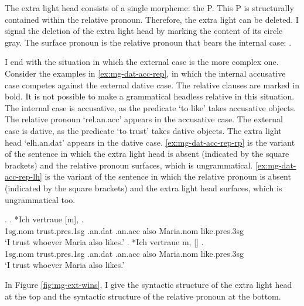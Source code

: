 The extra light head consists of a single morpheme: the P.
This P is structurally contained within the relative pronoun. Therefore, the extra light can be deleted. I signal the deletion of the extra light head by marking the content of its circle gray.
The surface pronoun is the relative pronoun that bears the internal case: .

I end with the situation in which the external case is the more complex one.
Consider the examples in \ref{ex:mg-dat-acc-rep}, in which the internal accusative case competes against the external dative case. The relative clauses are marked in bold. It is not possible to make a grammatical headless relative in this situation.
The internal case is accusative, as the predicate  `to like' takes accusative objects. The relative pronoun  `\ac{rel}.\ac{an}.\ac{acc}' appears in the accusative case.
The external case is dative, as the predicate  `to trust' takes dative objects. The extra light head  `\ac{elh}.\ac{an}.\ac{dat}' appears in the dative case.
\ref{ex:mg-dat-acc-rep-rp} is the variant of the sentence in which the extra light head is absent (indicated by the square brackets) and the relative pronoun surfaces, which is ungrammatical.
\ref{ex:mg-dat-acc-rep-lh} is the variant of the sentence in which the relative pronoun is absent (indicated by the square brackets) and the extra light head surfaces, which is ungrammatical too.

\ex.\label{ex:mg-dat-acc-rep}
\ag. *Ich vertraue [m],    .\\
1\ac{sg}.\ac{nom} trust.\ac{pres}.1\ac{sg}\scsub{[dat]} .\ac{an}.\ac{dat} .\ac{an}.\ac{acc} also Maria.\ac{nom} like.\ac{pres}.3\ac{sg}\scsub{[acc]}\\
`I trust whoever Maria also likes.' \label{ex:mg-dat-acc-rep-rp}
\bg. *Ich vertraue m, []   .\\
1\ac{sg}.\ac{nom} trust.\ac{pres}.1\ac{sg}\scsub{[dat]} .\ac{an}.\ac{dat} .\ac{an}.\ac{acc} also Maria.\ac{nom} like.\ac{pres}.3\ac{sg}\scsub{[acc]}\\
`I trust whoever Maria also likes.' \label{ex:mg-dat-acc-rep-lh}

In Figure \ref{fig:mg-ext-wins}, I give the syntactic structure of the extra light head at the top and the syntactic structure of the relative pronoun at the bottom.

